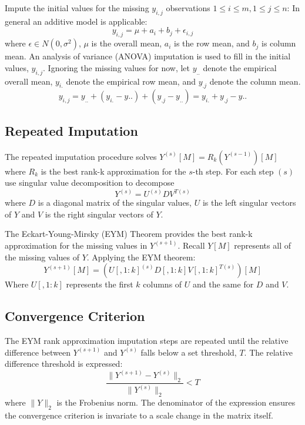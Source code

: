 \documentclass[12pt,twoside]{dukestatscithesis}
\theoremstyle{definition}
\theoremstyle{definition}
\theoremstyle{definition}
\theoremstyle{remark}
\begin{document}
Impute the initial values for the missing \(y_{i,j}\) observations
\(1 \leq i \leq m, 1 \leq j \leq n\): In general an additive model is
applicable: \[y_{i,j} = \mu + a_i + b_j + \epsilon_{i,j}\] where
\(\epsilon \in N(0,\sigma^2)\), \(\mu\) is the overall mean, \(a_i\) is
the row mean, and \(b_j\) is column mean. An analysis of variance
(ANOVA) imputation is used to fill in the initial values, \(y_{i,j}\).
Ignoring the missing values for now, let \(y_{..}\) denote the empirical
overall mean, \(y_{i.}\) denote the empirical row mean, and \(y_{.j}\)
denote the column mean.
\[y_{i,j} = y_{..} + (y_{i.}-y{..}) + (y_{.j}-y_{..}) = y_{i.} + y_{.j} - y{..}\]

\subsection{Repeated Imputation}\label{repeated-imputation}

The repeated imputation procedure solves
\(Y^{(s)}[M] = R_k(Y^{(s-1)})[M]\) where \(R_k\) is the best rank-k
approximation for the \(s\)-th step. For each step \((s)\) use singular
value decomposition to decompose \[Y^{(s)} =  U^{(s)}DV^{T(s)}\] where
\(D\) is a diagonal matrix of the singular values, \(U\) is the left
singular vectors of \(Y\) and \(V\) is the right singular vectors of
\(Y\).

The Eckart-Young-Mirsky (EYM) Theorem provides the best rank-k
approximation for the missing values in \(Y^{(s+1)}\). Recall \(Y[M]\)
represents all of the missing values of \(Y\). Applying the EYM theorem:
\[Y^{(s+1)}[M] = (U[,1:k]^{(s)}D[,1:k]V[,1:k]^{T(s)})[M]\] Where
\(U[,1:k]\) represents the first \(k\) columns of \(U\) and the same for
\(D\) and \(V\).

\subsection{Convergence Criterion}\label{convergence-criterion}

The EYM rank approximation imputation steps are repeated until the
relative difference between \(Y^{(s+1)}\) and \(Y^{(s)}\) falls below a
set threshold, \(T\). The relative difference threshold is expressed:
\[\frac{\|Y^{(s+1)}-Y^{(s)}\|_2}{\|Y^{(s)}\|_2} < T\] where \(\|Y\|_2\)
is the Frobenius norm. The denominator of the expression ensures the
convergence criterion is invariate to a scale change in the matrix
itself.
\end{document}
